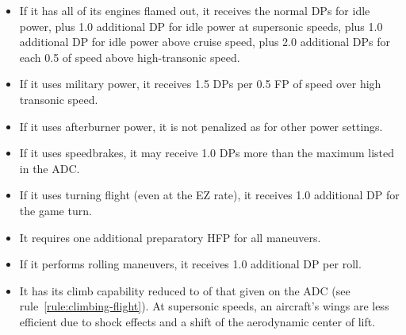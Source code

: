 \begin{advancedrules}
{\begin{itemize}
    \item If it has all of its engines flamed out, it receives the normal DPs for idle power, plus 1.0 additional DP for idle power at supersonic speeds, plus 1.0 additional DP for idle power above cruise speed, plus 2.0 additional DPs for each 0.5 of speed above high-transonic speed.
   
    \item If it uses military power, it receives 1.5 DPs per 0.5 FP of speed over high transonic speed.

    \item If it uses afterburner power, it is not penalized as for other power settings.

    \item If it uses speedbrakes, it may receive 1.0 DPs more than the maximum listed in the ADC.

    \item If it uses turning flight (even at the EZ rate), it receives 1.0 additional DP for the game turn.

    \item It requires one additional preparatory HFP for all maneuvers. 

    \item If it performs rolling maneuvers, it receives 1.0 additional DP per roll.

    \item It has its climb capability reduced to {\twothirds} of that given on the ADC (see rule~\ref{rule:climbing-flight}). At supersonic speeds, an aircraft's wings are less efficient due to shock effects and a shift of the aerodynamic center of lift.

\end{itemize}
}




\end{advancedrules}
